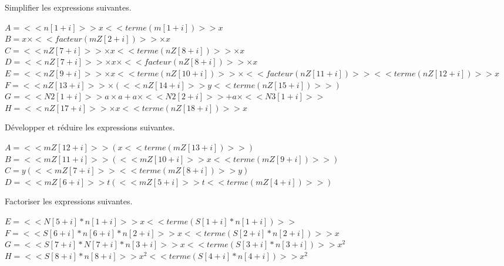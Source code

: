\begin{multicols}{2}

Simplifier les expressions suivantes.

\begin{multicols}{2}
$A=<<n[1+i]>> x <<terme(m[1+i])>> x$\\
$B=x\times <<facteur(mZ[2+i])>> \times x$\\
$C=<<nZ[7+i]>>\times x <<terme(nZ[8+i])>>\times x$\\
$D=<<nZ[7+i]>>\times x\times <<facteur(nZ[8+i])>>\times x$\\
$E=<<nZ[9+i]>> \times x<<terme(nZ[10+i])>>\times <<facteur(nZ[11+i])>> <<terme(nZ[12+i])>> x$\\
$F=<<nZ[13+i]>> \times (<<nZ[14+i]>>y <<terme(nZ[15+i])>>)$\\
$G=<<N2[1+i]>> a\times  a+a\times <<N2[2+i]>>+a\times <<N3[1+i]>>$\\
$H= <<nZ[17+i]>>\times x <<terme(nZ[18+i])>>x$
\end{multicols}


%
%
%


Développer et réduire les expressions suivantes.

\begin{multicols}{2}
$A=  <<mZ[12+i]>> (x  <<terme(mZ[13+i])>>)$\\
$B= <<mZ[11+i]>> ( <<mZ[10+i]>> x    <<terme(mZ[9+i])>>)$\\
$C=y( <<mZ[7+i]>>  <<terme(mZ[8+i])>> y)$\\
$D= <<mZ[6+i]>>  t(  <<mZ[5+i]>> t <<terme(mZ[4+i])>>)$
\end{multicols}



Factoriser les expressions suivantes.

\begin{multicols}{2}
$E=  <<N[5+i] * n[1+i]>> x  <<terme(S[1+i] * n[1+i])>>$\\
$F=  <<S[6+i] *n[6+i] * n[2+i]>> x  <<terme(S[2+i] * n[2+i])>> x$\\
$G=  <<S[7+i] *N[7+i] * n[3+i]>> x  <<terme(S[3+i] * n[3+i])>> x^2$\\
$H=  <<S[8+i] *n[8+i] >> x^2  <<terme(S[4+i] *n[4+i] )>> x^2$
\end{multicols}


\raggedcolumns
\end{multicols}

